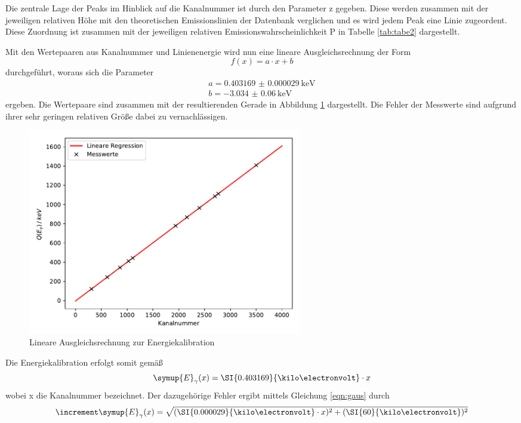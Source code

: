 Die zentrale Lage der Peaks im Hinblick auf die Kanalnummer ist durch den Parameter
z gegeben. Diese werden zusammen mit der jeweiligen relativen Höhe mit den theoretischen
Emissionslinien der Datenbank \cite{lara} verglichen und es wird jedem Peak eine Linie
zugeordent. Diese Zuordnung ist zusammen mit der jeweiligen relativen Emissionswahrscheinlichkeit P
in Tabelle \ref{tab:tabe2} dargestellt.

Mit den Wertepaaren aus Kanalnummer und Linienenergie wird nun eine lineare Ausgleichsrechnung der
Form
\begin{equation*}
  f(x) = a\cdot x +b
\end{equation*}
durchgeführt, woraus sich die Parameter
\begin{align}
  a = \SI{0.403169(29)}{\kilo\electronvolt} \\
  b = \SI{-3.034(60)}{\kilo\electronvolt}
\end{align}
ergeben. Die Wertepaare sind zusammen mit der resultierenden Gerade in Abbildung \ref{fig:plot3}
dargestellt. Die Fehler der Messwerte sind aufgrund ihrer sehr geringen relativen Größe dabei zu vernachlässigen.
\begin{figure}
  \centering
  \includegraphics[height=9cm]{plot3.pdf}
  \caption{Lineare Ausgleichsrechnung zur Energiekalibration}
  \label{fig:plot3}
\end{figure}
Die Energiekalibration erfolgt somit gemäß
\begin{equation}
  \symup{E}_{\gamma} (x) = \SI{0.403169}{\kilo\electronvolt}\cdot x
  \label{eqn:gerade}
\end{equation}
wobei x die Kanalnummer bezeichnet.
Der dazugehörige Fehler ergibt mittels Gleichung \ref{eqn:gaus} durch
\begin{equation}
   \increment \symup{E}_{\gamma} (x) =\sqrt{ (\SI{0.000029}{\kilo\electronvolt}\cdot x)^2 +
   (\SI{60}{\kilo\electronvolt})^2}
   \label{eqn:fgerade}
\end{equation}
